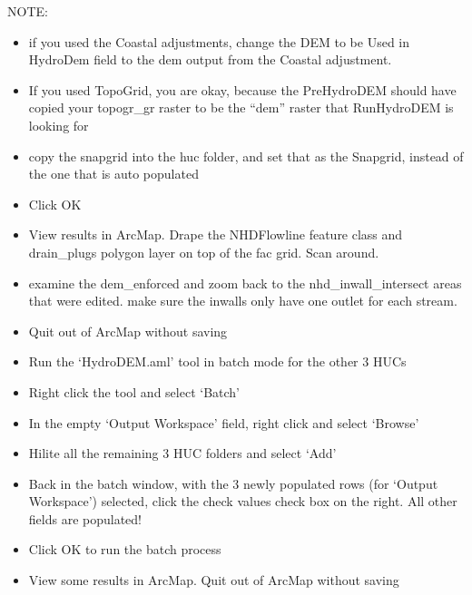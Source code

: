\documentclass[letterpaper,10pt,english]{sphinxmanual}
\begin{document}
NOTE:
\begin{itemize}
\item {} 
if you used the Coastal adjustments, change the DEM to be Used in HydroDem field to the dem output from the Coastal adjustment.

\item {} 
If you used TopoGrid, you are okay, because the PreHydroDEM should have copied your topogr\_gr raster to be the “dem” raster that RunHydroDEM is looking for

\item {} 
copy the snapgrid into the huc folder, and set that as the Snapgrid, instead of the one that is auto populated

\item {} 
Click OK

\item {} 
View results in ArcMap.  Drape the NHDFlowline feature class and drain\_plugs polygon layer on top of the fac grid.  Scan around.

\item {} 
examine the dem\_enforced and zoom back to the nhd\_inwall\_intersect areas that were edited.  make sure the inwalls only have one outlet for each stream.

\item {} 
Quit out of ArcMap without saving

\item {} 
Run the ‘HydroDEM.aml’ tool in batch mode for the other 3 HUCs

\item {} 
Right click the tool and select ‘Batch’

\item {} 
In the empty ‘Output Workspace’ field, right click and select ‘Browse’

\item {} 
Hilite all the remaining 3 HUC folders and select ‘Add’

\item {} 
Back in the batch window, with the 3 newly populated rows (for ‘Output Workspace’) selected, click the check values check box on the right.  All other fields are populated!

\item {} 
Click OK to run the batch process

\item {} 
View some results in ArcMap.  Quit out of ArcMap without saving

\end{itemize}
\end{document}
